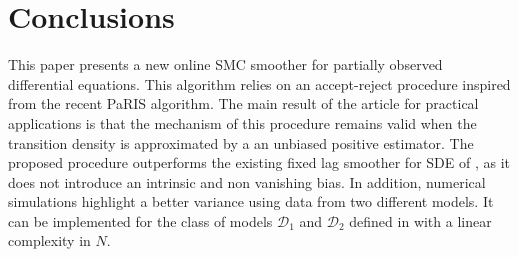\documentclass[12pt]{article}
\newcommand{\rmd}{\mathrm{d}}
\newcommand{\eqsp}{\;}
\newcommand{\1}{\mathrm{1}}
\newcommand{\mw}{\mathsf{w}}%
\begin{document}
\section{Conclusions}
This paper presents a new online SMC smoother for partially observed differential equations. This algorithm relies on an accept-reject procedure inspired from the recent PaRIS algorithm. The main result of the article for practical applications is that the mechanism of this procedure remains valid when the transition density is approximated by a an unbiased positive estimator. The proposed procedure outperforms the existing fixed lag smoother for SDE of \cite{olsson:strojby:2011}, as it does not introduce an intrinsic and non vanishing bias. In addition, numerical simulations highlight a better variance using data from two different models. It can be implemented for the class of models $\mathcal{D}_1$ and $\mathcal{D}_2$ defined in \cite{beskos:papaspiliopoulos:roberts:fearnhead:2006} with a linear complexity in $N$. 
\end{document}
